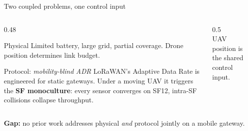 \documentclass[aspectratio=169,11pt]{beamer}
\newcommand{\emp}[1]{{\color{manpurple}\textbf{#1}}}
\newcommand{\qt}[1]{{\color{muted}#1}}
\begin{document}
\begin{frame}{Two coupled problems, one control input}
  \begin{columns}[T]
    \begin{column}{0.48\textwidth}
      \begin{block}{Physical}
        \small
        Limited battery, large grid, partial coverage.
        Drone position determines link budget.
      \end{block}
      \vspace{0.3em}
      \begin{block}{Protocol: \emph{mobility-blind ADR}}
        \small
        LoRaWAN's Adaptive Data Rate is engineered for static
        gateways. Under a moving UAV it triggers the
        \emp{SF monoculture}: every sensor converges on SF12,
        intra-SF collisions collapse throughput.
      \end{block}
    \end{column}
    \begin{column}{0.5\textwidth}
      \vspace{0.3em}
      \centering
      \resizebox{\linewidth}{!}{}\\
      {\scriptsize\qt{UAV position is the shared control input.}}
    \end{column}
  \end{columns}
  \vfill
  \emp{Gap:} no prior work addresses physical \emph{and} protocol
  jointly on a mobile gateway.
\end{frame}
\end{document}
